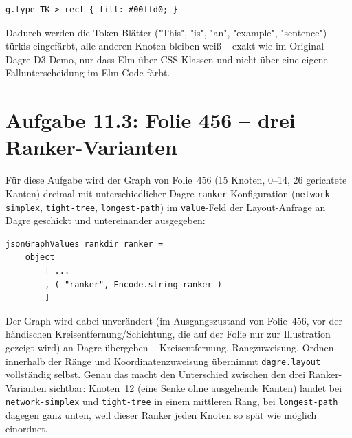 \documentclass[11pt,a4paper]{article}
\begin{document}
\begin{verbatim}
g.type-TK > rect { fill: #00ffd0; }
\end{verbatim}

Dadurch werden die Token-Blätter ("This", "is", "an", "example",
"sentence") türkis eingefärbt, alle anderen Knoten bleiben weiß --
exakt wie im Original-Dagre-D3-Demo, nur dass Elm über CSS-Klassen und nicht
über eine eigene Fallunterscheidung im Elm-Code färbt.

\section*{Aufgabe 11.3: Folie 456 -- drei Ranker-Varianten}

Für diese Aufgabe wird der Graph von Folie~456 (15 Knoten, 0--14, 26
gerichtete Kanten) dreimal mit unterschiedlicher Dagre-\texttt{ranker}-Konfiguration
(\texttt{network-simplex}, \texttt{tight-tree}, \texttt{longest-path}) im
\texttt{value}-Feld der Layout-Anfrage an Dagre geschickt und untereinander
ausgegeben:

\begin{verbatim}
jsonGraphValues rankdir ranker =
    object
        [ ...
        , ( "ranker", Encode.string ranker )
        ]
\end{verbatim}

Der Graph wird dabei unverändert (im Ausgangszustand von Folie~456, vor der
händischen Kreisentfernung/Schichtung, die auf der Folie nur zur Illustration
gezeigt wird) an Dagre übergeben -- Kreisentfernung, Rangzuweisung, Ordnen
innerhalb der Ränge und Koordinatenzuweisung übernimmt \texttt{dagre.layout}
vollständig selbst. Genau das macht den Unterschied zwischen den drei
Ranker-Varianten sichtbar: Knoten~12 (eine Senke ohne ausgehende Kanten) landet
bei \texttt{network-simplex} und \texttt{tight-tree} in einem mittleren Rang,
bei \texttt{longest-path} dagegen ganz unten, weil dieser Ranker jeden Knoten
so spät wie möglich einordnet.
\end{document}
